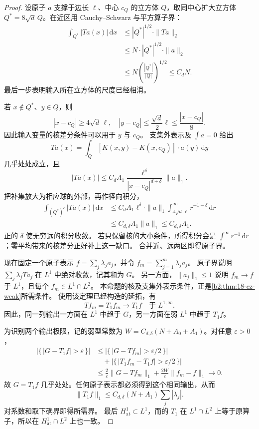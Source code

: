 \begin{proof}
设原子 \(a\) 支撑于边长 \(\ell\)、中心 \(c_Q\) 的立方体 \(Q\)，取同中心扩大立方体
\(Q^*=8\sqrt d\,Q\)。在近区用 Cauchy--Schwarz 与平方算子界：
\[
\begin{aligned}
 \int_{Q^*}|Ta(x)|\,\mathrm dx
 &\le |Q^*|^{1/2}\cdot\|Ta\|_2\\
 &\le N\cdot|Q^*|^{1/2}\cdot\|a\|_2\\
 &\le N\left(\frac{|Q^*|}{|Q|}\right)^{1/2}
 \le C_dN.
\end{aligned}
\]
最后一步表明输入所在立方体的尺度已经相消。

若 \(x\notin Q^*\)、\(y\in Q\)，则
\[
 |x-c_Q|\ge4\sqrt d\,\ell,
 \quad |y-c_Q|\le\frac{\sqrt d}{2}\ell
 \le\frac{|x-c_Q|}{8}.
\]
因此输入变量的核差分条件可以用于 \(y\) 与 \(c_Q\)。
支集外表示及 \(\int a=0\) 给出
\[
 Ta(x)=\int_Q[K(x,y)-K(x,c_Q)]\cdot a(y)\,\mathrm dy
\]
几乎处处成立，且
\[
 |Ta(x)|
 \le C_dA_1\frac{\ell^\delta}{|x-c_Q|^{d+\delta}}\|a\|_1.
\]
把补集放大为相应球的外部，再作径向积分，
\[
\begin{aligned}
 \int_{(Q^*)^c}|Ta(x)|\,\mathrm dx
 &\le C_dA_1\ell^\delta\cdot\|a\|_1
       \int_{4\sqrt d\,\ell}^\infty r^{-1-\delta}\,\mathrm dr\\
 &\le C_{d,\delta}A_1\|a\|_1
 \le C_{d,\delta}A_1.
\end{aligned}
\]
正的 \(\delta\) 使无穷远的积分收敛。
若只保留核的大小条件，所得积分会是
\(\int^\infty r^{-1}\,\mathrm dr\)；零平均带来的核差分正好补上这一缺口。
合并近、远两区即得原子界。

现在固定一个原子表示
\(f=\sum_j\lambda_ja_j\)，并令
\(f_m=\sum_{j=1}^m\lambda_ja_j\)。
原子界说明 \(\sum_j\lambda_jTa_j\) 在 \(L^1\) 中绝对收敛，记其和为 \(G\)。
另一方面，\(\|a_j\|_1\le1\) 说明 \(f_m\to f\) 于 \(L^1\)，且每个
\(f_m\in L^1\cap L^2\)。
本命题的核及支集外表示条件，正是\cref{b2:thm:18-cz-weak}所需条件。
使用该定理已经构造的延拓，有
\[
 Tf_m=T_1f_m\longrightarrow T_1f
 \quad\text{于 }L^{1,\infty}.
\]
因此，同一列输出一方面在 \(L^1\) 中趋于 \(G\)，另一方面在弱 \(L^1\) 中趋于 \(T_1f\)。

为识别两个输出极限，记的弱型常数为
\(W=C_{d,\delta}(N+A_0+A_1)\)。对任意 \(\varepsilon>0\)，
\[
\begin{aligned}
 |\{\,|G-T_1f|>\varepsilon\,\}|
 &\le |\{\,|G-Tf_m|>\varepsilon/2\,\}|\\
 &\quad+|\{\,|T_1f_m-T_1f|>\varepsilon/2\,\}|\\
 &\le\frac2\varepsilon\|G-Tf_m\|_1
       +\frac{2W}{\varepsilon}\|f_m-f\|_1
 \longrightarrow0.
\end{aligned}
\]
故 \(G=T_1f\) 几乎处处。任何原子表示都必须得到这个相同输出，从而
\[
 \|T_1f\|_1\le C_{d,\delta}(N+A_1)\sum_j|\lambda_j|.
\]
对系数和取下确界即得所需界。
最后 \(H^1_{\mathrm{at}}\subset L^1\)，而的 \(T_1\) 在
\(L^1\cap L^2\) 上等于原算子，所以在
\(H^1_{\mathrm{at}}\cap L^2\) 上也一致。
\end{proof}

